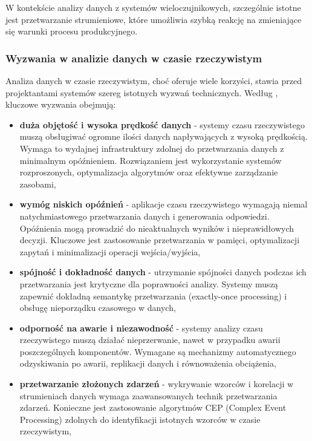 W kontekście analizy danych z systemów wieloczujnikowych, szczególnie istotne jest przetwarzanie strumieniowe, które umożliwia szybką reakcję na zmieniające się warunki procesu produkcyjnego.

\subsubsection{Wyzwania w analizie danych w czasie rzeczywistym}
\label{subsubsec:wyzwania_analizy_rt}

Analiza danych w czasie rzeczywistym, choć oferuje wiele korzyści, stawia przed projektantami systemów szereg istotnych wyzwań technicznych. Według \cite{geeksforgeeks_realtime}, kluczowe wyzwania obejmują:

\begin{itemize}
    \item \textbf{duża objętość i wysoka prędkość danych} - systemy czasu rzeczywistego muszą obsługiwać ogromne ilości danych napływających z wysoką prędkością. Wymaga to wydajnej infrastruktury zdolnej do przetwarzania danych z minimalnym opóźnieniem. Rozwiązaniem jest wykorzystanie systemów rozproszonych, optymalizacja algorytmów oraz efektywne zarządzanie zasobami,
    
    \item \textbf{wymóg niskich opóźnień} - aplikacje czasu rzeczywistego wymagają niemal natychmiastowego przetwarzania danych i generowania odpowiedzi. Opóźnienia mogą prowadzić do nieaktualnych wyników i nieprawidłowych decyzji. Kluczowe jest zastosowanie przetwarzania w pamięci, optymalizacji zapytań i minimalizacji operacji wejścia/wyjścia,
    
    \item \textbf{spójność i dokładność danych} - utrzymanie spójności danych podczas ich przetwarzania jest krytyczne dla poprawności analizy. Systemy muszą zapewnić dokładną semantykę przetwarzania (exactly-once processing) i obsługę nieporządku czasowego w danych,
    
    \item \textbf{odporność na awarie i niezawodność} - systemy analizy czasu rzeczywistego muszą działać nieprzerwanie, nawet w przypadku awarii poszczególnych komponentów. Wymagane są mechanizmy automatycznego odzyskiwania po awarii, replikacji danych i równoważenia obciążenia,
    
    \item \textbf{przetwarzanie złożonych zdarzeń} - wykrywanie wzorców i korelacji w strumieniach danych wymaga zaawansowanych technik przetwarzania zdarzeń. Konieczne jest zastosowanie algorytmów CEP (Complex Event Processing) zdolnych do identyfikacji istotnych wzorców w czasie rzeczywistym,
    

\end{itemize}
